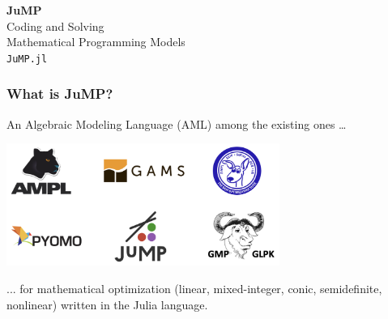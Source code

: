 \documentclass[]{beamer}
\begin{document}

\begin{frame}

\begin{center} 
{\Large \textbf{\Huge{JuMP} \vspace{5mm}} \\ Coding and Solving \\ Mathematical Programming Models \vspace{5mm}\\ \texttt{JuMP.jl}\\ }
\end{center}


              
\end{frame}

% 
%

\begin{frame}
  \frametitle{What is JuMP?}


 An Algebraic Modeling Language (AML) among the existing ones \dots
 \vspace{5mm}
\begin{center}
\includegraphics[angle=0,origin=c,height=40mm]{AML.png}
\end{center}
\vspace{5mm}

 ... for mathematical optimization (linear, mixed-integer, conic, semidefinite, nonlinear) written in the Julia language.

\end{frame}

% 
%
\end{document}
